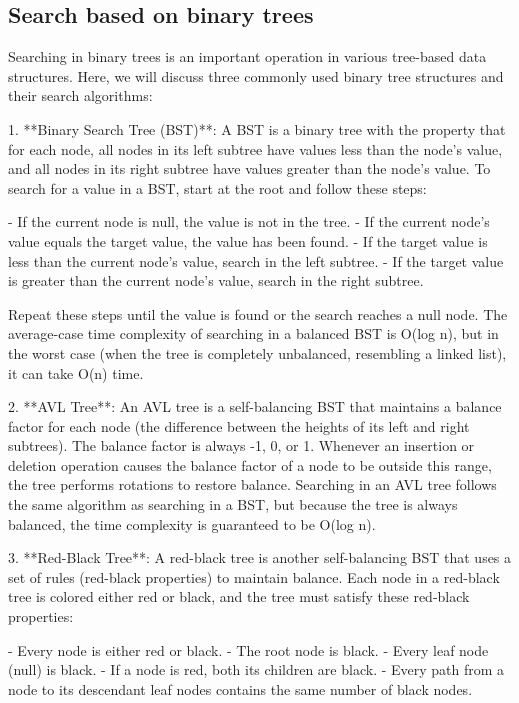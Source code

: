 \documentclass{article}
\begin{document}
\subsection{Search based on binary trees}

Searching in binary trees is an important operation in various tree-based data structures. Here, we will discuss three commonly used binary tree structures and their search algorithms:

1. **Binary Search Tree (BST)**: A BST is a binary tree with the property that for each node, all nodes in its left subtree have values less than the node's value, and all nodes in its right subtree have values greater than the node's value. To search for a value in a BST, start at the root and follow these steps:

   - If the current node is null, the value is not in the tree.
   - If the current node's value equals the target value, the value has been found.
   - If the target value is less than the current node's value, search in the left subtree.
   - If the target value is greater than the current node's value, search in the right subtree.

   Repeat these steps until the value is found or the search reaches a null node. The average-case time complexity of searching in a balanced BST is O(log n), but in the worst case (when the tree is completely unbalanced, resembling a linked list), it can take O(n) time.

2. **AVL Tree**: An AVL tree is a self-balancing BST that maintains a balance factor for each node (the difference between the heights of its left and right subtrees). The balance factor is always -1, 0, or 1. Whenever an insertion or deletion operation causes the balance factor of a node to be outside this range, the tree performs rotations to restore balance. Searching in an AVL tree follows the same algorithm as searching in a BST, but because the tree is always balanced, the time complexity is guaranteed to be O(log n).

3. **Red-Black Tree**: A red-black tree is another self-balancing BST that uses a set of rules (red-black properties) to maintain balance. Each node in a red-black tree is colored either red or black, and the tree must satisfy these red-black properties:

   - Every node is either red or black.
   - The root node is black.
   - Every leaf node (null) is black.
   - If a node is red, both its children are black.
   - Every path from a node to its descendant leaf nodes contains the same number of black nodes.
\end{document}
